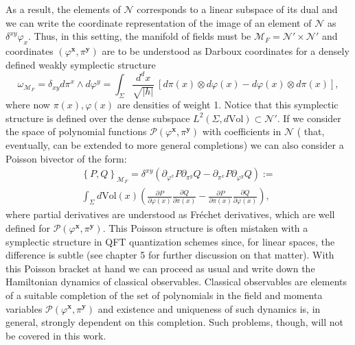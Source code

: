 \documentclass{elsarticle}%
\begin{document}
As a result, the elements of $\mathcal{N}$ corresponds to a linear subspace of its dual and we can write the coordinate representation of the image of an element of $\mathcal{N}$ as $\delta^{xy}\varphi_x$. Thus, in this setting, the manifold of fields must  be $\mathcal{M}_F=\mathcal{N}'\times \mathcal{N}'$ and coordinates $(\varphi^\mathbf{x},\pi^\mathbf{y})$ are to be understood as Darboux coordinates for a densely defined weakly symplectic structure
\begin{equation}
\label{eq:symplecticFormlifted}
\omega_{\mathcal{M}_F}=\delta_{xy} d\pi^x \wedge d\varphi^y =\int_\Sigma \frac{d^dx}{\sqrt{\lvert h\rvert}}\ [d\pi(x)\otimes d\varphi(x)-d\varphi(x)\otimes d\pi(x)],
\end{equation}
where now $\pi(x),\varphi(x)$ are densities of weight 1. Notice that this symplectic structure is defined over the dense subspace $L^2(\Sigma,d\textrm{Vol})\subset \mathcal{N}'$. If we consider the space of polynomial functions  $\mathcal{P}(\varphi^\mathbf{x},\pi^\mathbf{y})$ with coefficients in $\mathcal{N}$ ( that, eventually, can be  extended to more general completions) we can also consider a Poisson bivector of the form:
\begin{multline}
\label{eq:poissonbracket}
\left\{P,Q\right\}_{\mathcal{M}_F}=
\delta^{xy}\left( \partial_{\varphi^x}P\partial_{\pi^y}Q-\partial_{\pi^x}P\partial_{\varphi^y}Q \right):=\\
\int_\Sigma d\textrm{Vol}(x)\left( \frac{\partial P}{\partial\varphi(x)}\frac{\partial Q}{\partial\pi(x)}-\frac{\partial P}{\partial\pi(x)}\frac{\partial Q}{\partial\varphi(x)} \right),
\end{multline}
where partial derivatives are understood as Fréchet derivatives, which are well defined for $\mathcal{P}(\varphi^\mathbf{x},\pi^\mathbf{y})$. This Poisson structure is often mistaken with a symplectic structure in QFT quantization schemes since, for linear spaces, the difference is subtle (see \cite{brunettiAdvancesAlgebraic2015} chapter 5 for further discussion on that matter). With this Poisson bracket at hand we can proceed as usual and write down the Hamiltonian dynamics of classical observables.  Classical observables are elements of a suitable completion of the set of polynomials in the field and momenta variables $\mathcal{P}(\varphi^\mathbf{x},\pi^\mathbf{y})$ and existence and uniqueness of such dynamics is, in general, strongly dependent on this completion.   Such problems, though, will not be covered in this work.
\end{document}
